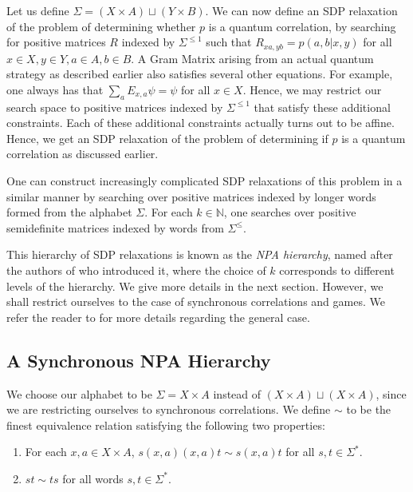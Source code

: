 \documentclass[a4paper,onecolumn,11pt,accepted=2026-01-06]{quantumarticle}
\theoremstyle{plain}
\theoremstyle{remark}
\theoremstyle{definition}
\begin{document}
Let us define $\Sigma = (X \times A) \sqcup (Y \times B)$. We can now define an SDP relaxation of the problem of determining whether $p$ is a quantum correlation, by searching for positive matrices $R$ indexed by $\Sigma^{\leq 1}$ such that $R_{xa, yb} = p(a,b|x,y)$ for all $x \in X, y \in Y, a \in A, b \in B$. A Gram Matrix arising from an actual quantum strategy as described earlier also satisfies several other equations. For example, one always has that $\sum_{a} E_{x,a}\psi = \psi$ for all $x \in X$. Hence, we may restrict our search space to positive matrices indexed by $\Sigma^{\leq 1}$ that satisfy these additional constraints. Each of these additional constraints actually turns out to be affine. Hence, we get an SDP relaxation of the problem of determining if $p$ is a quantum correlation as discussed earlier. 

One can construct increasingly complicated SDP relaxations of this problem in a similar manner by searching over positive matrices indexed by longer words formed from the alphabet $\Sigma$. For each $k \in \mathbb{N}$, one searches over positive semidefinite matrices indexed by words from $\Sigma^{\leq}$.

This hierarchy of SDP relaxations is known as the \emph{NPA hierarchy}, named after the authors of \cite{Navascues_2008} who introduced it, where the choice of $k$ corresponds to different levels of the hierarchy. We give more details in the next section. However, we shall restrict ourselves to the case of synchronous correlations and games. We refer the reader to \cite{Navascues_2008} for more details regarding the general case. 

\subsection{A Synchronous NPA Hierarchy}

We choose our alphabet to be $\Sigma = X \times A$ instead of $(X \times A) \sqcup (X\times A)$, since we are restricting ourselves to synchronous correlations. We define $\sim$ to be the finest equivalence relation satisfying the following two properties: %
\begin{enumerate}
    \item For each $x,a \in X \times A$, $s(x,a)(x,a)t \sim s(x,a)t$ for all $s,t \in \Sigma^*$.%
    \item $st \sim ts$ for all words $s,t \in \Sigma^*$. %
\end{enumerate}
\end{document}
